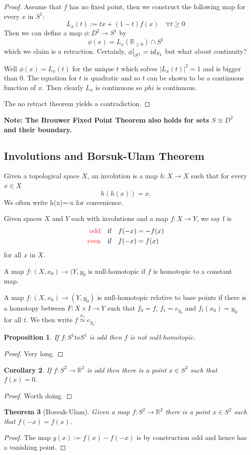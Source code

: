 \documentclass[11pt]{article}
\newcommand{\defeq}{:=}
\newcommand{\abs}[1]{|#1|}
\newcommand{\homrelset}[1]{\stackrel{#1}{\simeq}}
\newcommand\restr[2]{{%
  \left.\kern-\nulldelimiterspace %
  #1 %
  \vphantom{\big|} %
  \right|_{#2} %
  }}
\newcommand{\R}{\mathbb{R}}
\newenvironment{defin}
	{\begin{mdframed}[backgroundcolor=white, roundcorner=5pt, linewidth=1pt]}
	{\end{mdframed}}
\newcommand{\mdf}[1]{{\color{red} #1}}
\newenvironment{note}
	{\begin{mdframed}[backgroundcolor=white, linecolor=red, roundcorner=5pt, linewidth=1pt]\bfseries{Note:}\normalfont}
	{\end{mdframed}}
\newtheorem{theorem}{Theorem}[section]
\newtheorem{prop}[theorem]{Proposition}
\newtheorem{cor}[theorem]{Corollary}
\begin{document}
\begin{proof}
Assume that $f$ has no fixed point, then we construct the following map for every $x$ in $S^1$:
\[
	L_x(t)\defeq tx+(1-t)f(x)\quad \forall t\geq 0
\]
Then we can define a map $\phi:D^2\to S^1$ by
\[
	\phi(x)=L_x(\R_{\geq 0})\cap S^1
\]
which we claim is a retraction.
Certainly, $\restr{\phi}{S^1}=id_{S_1}$ but what about continuity?

Well $\phi(x)=L_x(t)$ for the unique $t$ which solves $\abs{L_x(t)}^2=1$ and is bigger than 0.
The equation for $t$ is quadratic and so $t$ can be shown to be a continuous function of $x$.
Then clearly $L_x$ is continuous so $phi$ is continuous.

The no retract theorem yields a contradiction.
\end{proof}
\begin{note}
The Brouwer Fixed Point Theorem also holds for sets $S\cong D^2$ and their boundary.
\end{note}
\subsection{Involutions and Borsuk-Ulam Theorem}
\begin{defin}
	Given a topological space $X$, an \mdf{involution} is a map $h:X\to X$ such that for every $x\in X$
	\[
		h(h(x))=x.
	\]
	We often write h(x)=-x for convenience.

	Given spaces $X$ and $Y$ each with involutions and a map $f:X\to Y$, we say f is
	\begin{align*}
		\mdf{\text{odd}}\quad&\text{if}\quad f(-x)=-f(x) \\
		\mdf{\text{even}}\quad&\text{if}\quad f(-x)=f(x)
	\end{align*}
	for all $x$ in $X$.

	A map $f:(X,x_0)\to (Y,y_0$ is \mdf{null-homotopic} if $f$ is homotopic to a constant map.

	A map $f:(X,x_0)\to (Y,y_0)$ is \mdf{null-homotopic relative to base points} if there is a homotopy between $F:X\times I \to Y$ such that $f_0=f$, $f_1=e_{y_0}$ and $f_t(x_0)=y_0$ for all $t$.
	We then write $f\homrelset{x_o} e_{y_0}$.
\end{defin}
\begin{prop}
If $f:S^1 to S^1$ is odd then $f$ is not null-homotopic.
\end{prop}
\begin{proof}
Very long.
\end{proof}
\begin{cor}
	If $f:S^2 \to \R^2$ is odd then there is a point $x\in S^2$ such that $f(x)=0$.
\end{cor}
\begin{proof}
Worth doing.
\end{proof}
\begin{theorem}[Borsuk-Ulam]
Given a map $f:S^2\to\R^2$ there is a point $x\in S^2$ such that $f(-x)=f(x)$.
\end{theorem}
\begin{proof}
The map $g(x)\defeq f(x) - f(-x)$ is by construction odd and hence has a vanishing point.
\end{proof}
\end{document}
